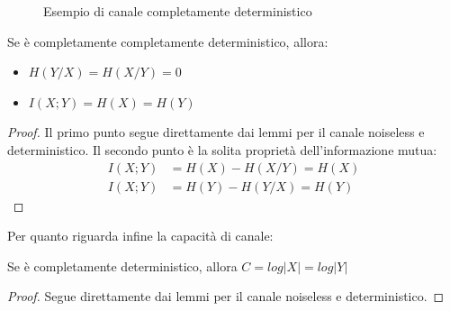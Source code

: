 \begin{figure}[htbp]
  \centering
  \hspace{1cm}
  \caption{Esempio di canale completamente deterministico}
  \label{fig:cdeterministico}
\end{figure}

\begin{lemma}
 Se  è completamente completamente deterministico, allora:
 \begin{itemize}
  \item $H(Y/X)=H(X/Y)=0$
  \item $I(X;Y)=H(X)=H(Y)$
 \end{itemize}
 \begin{proof}
  Il primo punto segue direttamente dai lemmi per il canale noiseless e deterministico.
  Il secondo punto è la solita proprietà dell'informazione mutua:
  \[\begin{split}
   I(X;Y)&=H(X)-H(X/Y)=H(X) \\
   I(X;Y)&=H(Y)-H(Y/X)=H(Y)
   \end{split}
  \]

 \end{proof}
\end{lemma}

\noindent
Per quanto riguarda infine la capacità di canale:

\begin{lemma}
Se  è completamente deterministico, allora $C=log|X|=log|Y|$
\begin{proof}
Segue direttamente dai lemmi per il canale noiseless e deterministico.
\end{proof}
\end{lemma}



